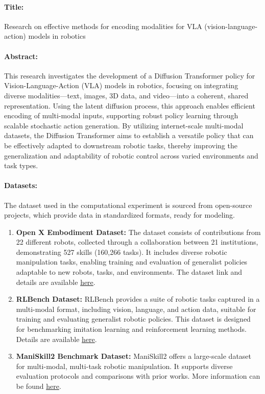 \documentclass[12pt]{article}
\begin{document}
\paragraph{Title:} Research on effective methods for encoding modalities for VLA (vision-language-action) models in robotics

\paragraph{Abstract:} This research investigates the development of a Diffusion Transformer policy for Vision-Language-Action (VLA) models in robotics, focusing on integrating diverse modalities—text, images, 3D data, and video—into a coherent, shared representation. Using the latent diffusion process, this approach enables efficient encoding of multi-modal inputs, supporting robust policy learning through scalable stochastic action generation. By utilizing internet-scale multi-modal datasets, the Diffusion Transformer aims to establish a versatile policy that can be effectively adapted to downstream robotic tasks, thereby improving the generalization and adaptability of robotic control across varied environments and task types. 

\paragraph{Datasets:} The dataset used in the computational experiment is sourced from open-source projects, which provide data in standardized formats, ready for modeling.
\begin{enumerate}
    \item \textbf{Open X Embodiment Dataset:} The dataset consists of contributions from 22 different robots, collected through a collaboration between 21 institutions, demonstrating 527 skills (160,266 tasks). It includes diverse robotic manipulation tasks, enabling training and evaluation of generalist policies adaptable to new robots, tasks, and environments. The dataset link and details are available \href{https://openxembodiment.org}{here}.
    \item \textbf{RLBench Dataset:} RLBench provides a suite of robotic tasks captured in a multi-modal format, including vision, language, and action data, suitable for training and evaluating generalist robotic policies. This dataset is designed for benchmarking imitation learning and reinforcement learning methods. Details are available \href{https://github.com/stepjam/RLBench}{here}.
    \item \textbf{ManiSkill2 Benchmark Dataset:} ManiSkill2 offers a large-scale dataset for multi-modal, multi-task robotic manipulation. It supports diverse evaluation protocols and comparisons with prior works. More information can be found \href{https://github.com/haosulab/ManiSkill}{here}.
\end{enumerate}
\end{document}
